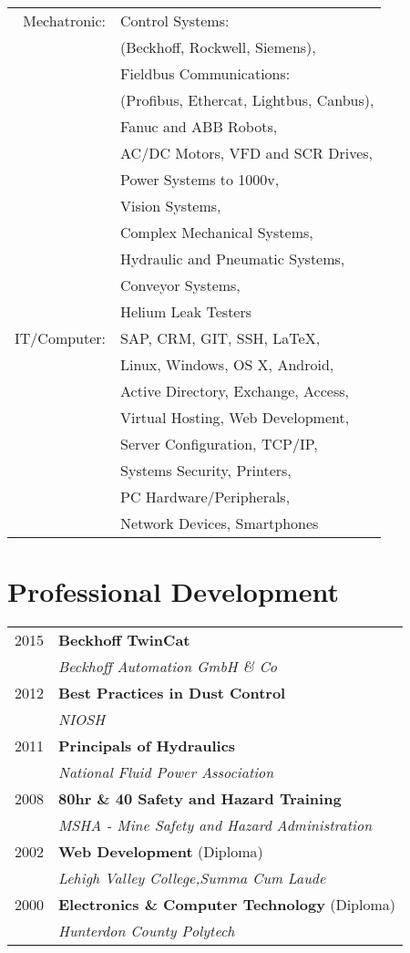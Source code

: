 \documentclass[10pt]{article} %
\begin{document}
\begin{minipage}[t]{0.44\textwidth}
\begin{tabular}{rl}
Mechatronic: & Control Systems: \\ 
& (Beckhoff, Rockwell, Siemens), \\
& Fieldbus Communications: \\ 
& (Profibus, Ethercat, Lightbus, Canbus), \\
& Fanuc and ABB Robots, \\
& AC/DC Motors, VFD and SCR Drives,\\
& Power Systems to 1000v, \\
& Vision Systems, \\
& Complex Mechanical Systems, \\
& Hydraulic and Pneumatic Systems,  \\
& Conveyor Systems, \\
& Helium Leak Testers \\
IT/Computer: & SAP, CRM, GIT, SSH, \LaTeX, \\
& Linux, Windows, OS X, Android,\\
& Active Directory, Exchange, Access, \\
& Virtual Hosting, Web Development,\\
& Server Configuration, TCP/IP,\\
& Systems Security, Printers, \\
& PC Hardware/Peripherals,\\
& Network Devices, Smartphones \\
\end{tabular}
\smallskip

\section{Professional Development} 

\begin{tabular}{rl} %
2015 & \textbf{Beckhoff TwinCat}\\
    & \textit{Beckhoff Automation GmbH \& Co}\\
2012 & \textbf{Best Practices in Dust Control}\\
& \textit{NIOSH}\\
2011 & \textbf{Principals of Hydraulics} \\ 
& \textit{National Fluid Power Association}\\
    2008 & \textbf{80hr \& 40 Safety and Hazard Training}\\
& \textit{MSHA - Mine Safety and Hazard Administration}\\
2002 & \textbf{Web Development} \footnotesize(Diploma) \\ 
& \textit{Lehigh Valley College,\small Summa Cum Laude}\\
2000 & \textbf{Electronics \& Computer Technology} \footnotesize(Diploma)\\
& \textit{Hunterdon County Polytech}\\


\end{tabular}
\end{minipage}
\end{document}
